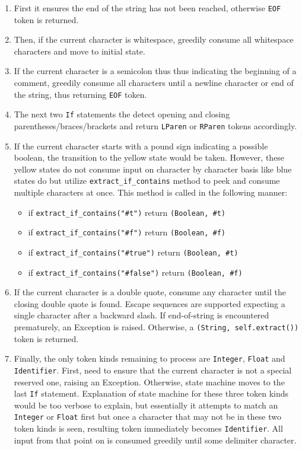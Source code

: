 \begin{itemize}
\begin{enumerate}
\item First it ensures the end of the string has not been reached, otherwise \texttt{EOF} token is returned. 
\item Then, if the current character is whitespace, greedily consume all whitespace characters and move to initial state.
\item If the current character is a semicolon thus thus indicating the beginning of a comment, greedily consume all characters until a newline character or end of the string, thus returning \texttt{EOF} token. 
\item The next two \texttt{If} statements the detect opening and closing parentheses/braces/brackets and return \texttt{LParen} or \texttt{RParen} tokens accordingly.
\item If the current character starts with a pound sign indicating a possible boolean, the transition to the yellow state would be taken. However, these yellow states do not consume input on character by character basis like blue states do but utilize \texttt{extract\_if\_contains} method to peek and consume multiple characters at once. This method is called in the following manner:
\begin{itemize}
\item
if \texttt{extract\_if\_contains("\#t")} return \texttt{(Boolean, \#t)}
\item
if \texttt{extract\_if\_contains("\#f")} return \texttt{(Boolean, \#f)}
\item
if \texttt{extract\_if\_contains("\#true")} return \texttt{(Boolean, \#t)}
\item
if \texttt{extract\_if\_contains("\#false")} return \texttt{(Boolean, \#f)}
\end{itemize}

\item If the current character is a double quote, consume any character until the closing double quote is found. Escape sequences are supported expecting a single character after a backward slash. If end-of-string is encountered prematurely, an Exception is raised. Otherwise, a \texttt{(String, self.extract())} token is returned.

\item Finally, the only token kinds remaining to process are \texttt{Integer}, \texttt{Float} and \texttt{Identifier}. First, need to ensure that the current character is not a special reserved one, raising an Exception. Otherwise, state machine moves to the last \texttt{If} statement. Explanation of state machine for these three token kinds would be too verbose to explain, but essentially it attempts to match an \texttt{Integer} or \texttt{Float} first but once a character that may not be in these two token kinds is seen, resulting token immediately becomes \texttt{Identifier}. All input from that point on is consumed greedily until some delimiter character.
\end{enumerate}

\end{itemize}


